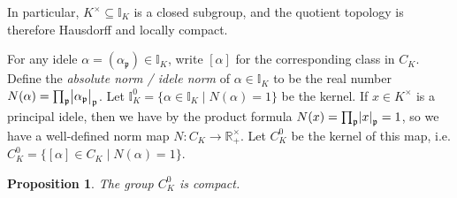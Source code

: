 \documentclass[11pt]{article}
\theoremstyle{definition}
\theoremstyle{plain}
\newtheorem{proposition}[definition]{Proposition}
\theoremstyle{remark}
\newcommand{\II}{\mathbb{I}}
\newcommand{\RR}{\mathbb{R}}
\newcommand{\fp}{\mathfrak{p}}
\begin{document}
In particular, $K^\times \subseteq \II_K$ is a closed subgroup, and the quotient topology is therefore Hausdorff and locally compact.

For any idele $\alpha = (\alpha_\fp) \in \II_K$, write $[\alpha]$ for the corresponding class in $C_K$. Define the \emph{absolute norm / idele norm} of $\alpha \in \II_K$ to be the real number $N(\alpha) = \prod_{\fp} \abs{\alpha_\fp}_\fp$. Let $\II_K^0 = \{\alpha \in \II_K \mid N(\alpha) = 1\}$ be the kernel. If $x \in K^\times$ is a principal idele, then we have by the product formula $N(x) = \prod_\fp \abs{x}_\fp = 1$, so we have a well-defined norm map $N : C_K \to \RR^\times_+$. Let $C_K^0$ be the kernel of this map, i.e. $C_K^0 = \{[\alpha] \in C_K \mid N(\alpha) = 1\}$.

\begin{proposition}\label{prop:9_12}
    The group $C_K^0$ is compact.
\end{proposition}
\end{document}
